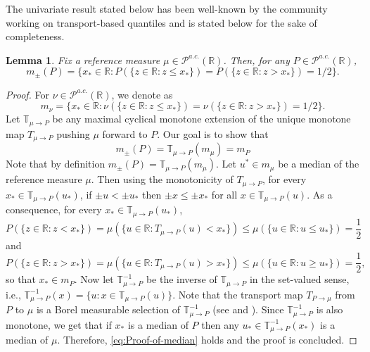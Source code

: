\documentclass[11pt]{article}
\newcommand{\R}{\mathbb{R}}
\theoremstyle{plain}
\newtheorem{lemma}[sectioncount]{Lemma}
\theoremstyle{definition}
\begin{document}
{
The univariate result stated below has been well-known by the community working on transport-based quantiles and is stated below for the sake of completeness. 

\begin{lemma}\label{lem:univariate-median} Fix a reference measure $\mu\in \mathcal{P}^{a.c.}(\R)$. Then, for any  $P\in \mathcal{P}^{a.c.}(\R)$,
$$ m_\pm(P) = \{ x_*\in \R:  P(\{z\in \R: z\leq x_*\}) = P(\{z\in \R: z> x_*\})=1/2 \}.$$
\end{lemma}
\begin{proof}
For $\nu\in \mathcal{P}^{a.c.}(\R)$, we denote as 
    $$ m_\nu = \{ x_*\in \R:  \nu(\{z\in \R: z\leq x_*\}) = \nu(\{z\in \R: z> x_*\})=1/2 \}. $$
Let  $\mathbb{T}_{\mu\to P }$ be any maximal {  cyclical} monotone extension of the unique monotone map ${T}_{\mu\to P }$ pushing $\mu$ forward to $P$.
Our goal is to show that 
\begin{equation}
    \label{eq:Proof-of-median}
m_\pm (P)=\mathbb{T}_{\mu\to P }(m_\mu)= m_P
\end{equation}
Note that by definition $m_\pm (P)=\mathbb{T}_{\mu\to P }(m_\mu)$. Let $u^*\in m_\mu$ be a median of the reference measure $\mu$. 
 Then using the monotonicity of ${T}_{\mu\to P }$, for every $x_*\in \mathbb{T}_{\mu\to P }(u_*) $,   if $\pm u< \pm u_*$ then $ \pm x \leq \pm x_*$ for all $x\in \mathbb{T}_{\mu\to P }(u)$. As a consequence,  for every $x_*\in \mathbb{T}_{\mu\to P }(u_*) $,
    $$ P(\{z\in \R: z< x_*\}) = \mu(\{ u\in \R : {T}_{\mu\to P }(u) <x_*\}) \leq    \mu(\{ u \in \R:u \leq u_*\})  =\frac{1}{2}$$
    and 
      $$ P(\{z\in \R: z> x_*\}) = \mu(\{ u\in \R : {T}_{\mu\to P }(u) >x_*\}) \leq    \mu(\{ u\in \R :u \geq u_*\})  =\frac{1}{2},$$
so that $x_*\in m_P$. Now let  $\mathbb{T}_{\mu\to P }^{-1}$ be the inverse of $\mathbb{T}_{\mu\to P }$ in the set-valued sense, i.e., $\mathbb{T}_{\mu\to P }^{-1}(x) =\{u: x\in  \mathbb{T}_{\mu\to P }(u) \}$.  Note that the transport map  $T_{P\to \mu}$ from  $P$ to $\mu$ is a Borel  measurable selection of $\mathbb{T}_{\mu\to P }^{-1}$ (see \cite[Remark~16]{McCann.95} and \cite[Corollary~23.5.1.]{Rockafellar.70}). Since $\mathbb{T}_{\mu\to P }^{-1}$ is also monotone, we get that if $x_*$ is a median of $P$ then any $u_*\in \mathbb{T}_{\mu\to P }^{-1}(x_*)$ is a median of $ \mu$. Therefore, \eqref{eq:Proof-of-median} holds and the proof is concluded. 
\end{proof}
}

 




\end{document}
